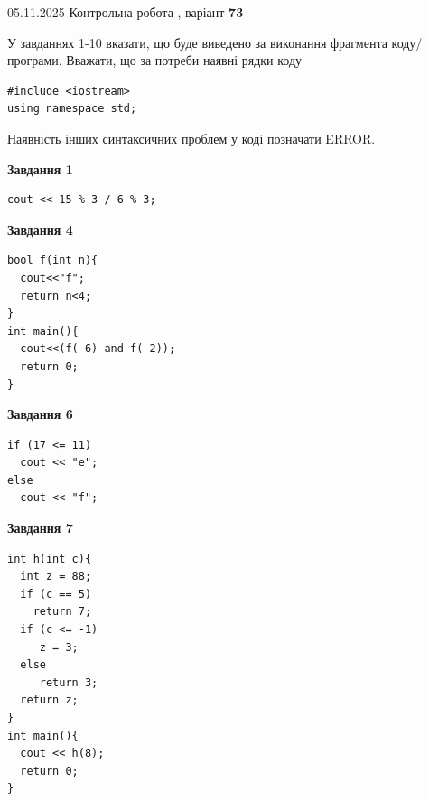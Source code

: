 \documentclass[12pt, ukrainian]{article}
\begin{document}
\newpage

{\Large{05.11.2025 Контрольна робота , варіант  \No \textbf { 73 }\par}}
{
\begin {large}
У завданнях 1-10 вказати, що буде виведено за виконання фрагмента коду/про\-гра\-ми.
Вважати, що за потреби наявні рядки коду
\begin{verbatim}
#include <iostream>
using namespace std;
\end{verbatim}
Наявність інших синтаксичних проблем у коді позначати ERROR.

\begin{minipage}[t]{7.0cm}

\begin{center}
\textbf{Завдання 1}
\end{center}
\vspace{-8mm}

\begin{verbatim}
cout << 15 % 3 / 6 % 3;
\end{verbatim}



\begin{center}
\textbf{Завдання 4}
\end{center}
\vspace{-8mm}

\begin{verbatim}
bool f(int n){
  cout<<"f";
  return n<4;
}
int main(){
  cout<<(f(-6) and f(-2));
  return 0;
}
\end{verbatim}



\begin{center}
\textbf{Завдання 6}
\end{center}
\vspace{-8mm}

\begin{verbatim}
if (17 <= 11)
  cout << "e";
else
  cout << "f";
\end{verbatim}



\begin{center}
\textbf{Завдання 7}
\end{center}
\vspace{-8mm}

\begin{verbatim}
int h(int c){
  int z = 88;
  if (c == 5)
    return 7;
  if (c <= -1)
     z = 3;
  else
     return 3;
  return z;
}
int main(){
  cout << h(8);
  return 0;
}
\end{verbatim}


\end{minipage}
\end{large}}
\end{document}
